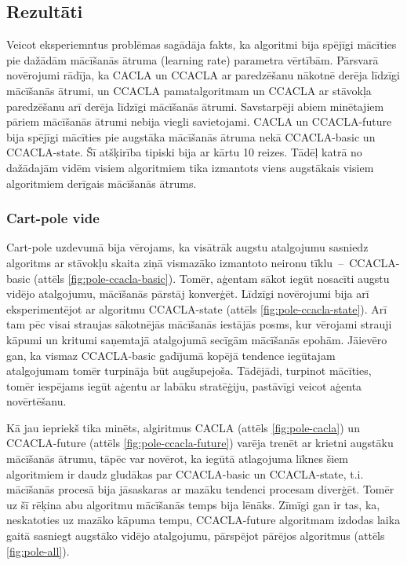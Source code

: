 \documentclass{ludis} %
\begin{document}
\subsection{Rezultāti}
Veicot eksperiemntus problēmas sagādāja fakts, ka algoritmi bija spējīgi
mācīties pie dažādām mācīšanās ātruma (learning rate) parametra vērtībām.
Pārsvarā novērojumi rādīja, ka CACLA un CCACLA ar paredzēšanu nākotnē derēja
līdzīgi mācīšanās ātrumi, un CCACLA pamatalgoritmam un CCACLA ar stāvokļa
paredzēšanu arī derēja līdzīgi mācīšanās ātrumi. Savstarpēji abiem minētajiem
pāriem mācīšanās ātrumi nebija viegli savietojami. CACLA un CCACLA-future bija
spējīgi mācīties pie augstāka mācīšanās ātruma nekā CCACLA-basic un
CCACLA-state. Šī atšķirība tipiski bija ar kārtu 10 reizes. Tādēļ katrā no
dažādajām vidēm visiem algoritmiem tika izmantots viens augstākais visiem
algoritmiem derīgais mācīšanās ātrums.

\subsubsection{Cart-pole vide}
Cart-pole uzdevumā bija vērojams, ka visātrāk augstu atalgojumu sasniedz
algoritms ar stāvokļu skaita ziņā vismazāko izmantoto neironu
tīklu~--~CCACLA-basic (attēls \ref{fig:pole-ccacla-basic}). Tomēr, aģentam sākot
iegūt nosacīti augstu vidējo atalgojumu, mācīšanās pārstāj konverģēt. Līdzīgi
novērojumi bija arī eksperimentējot ar algoritmu CCACLA-state (attēls
\ref{fig:pole-ccacla-state}). Arī tam pēc visai straujas sākotnējās mācīšanās
iestājās posms, kur vērojami strauji kāpumi un kritumi saņemtajā atalgojumā
secīgām mācīšanās epohām. Jāievēro gan, ka vismaz CCACLA-basic gadījumā kopējā
tendence iegūtajam atalgojumam tomēr turpināja būt augšupejoša. Tādējādi,
turpinot mācīties, tomēr iespējams iegūt aģentu ar labāku stratēģiju, pastāvīgi
veicot aģenta novērtēšanu.

Kā jau iepriekš tika minēts, algiritmus CACLA (attēls \ref{fig:pole-cacla}) un
CCACLA-future (attēls \ref{fig:pole-ccacla-future}) varēja trenēt ar krietni
augstāku mācīšanās ātrumu, tāpēc var novērot, ka iegūtā atlagojuma līknes šiem
algoritmiem ir daudz gludākas par CCACLA-basic un CCACLA-state, t.i. mācīšanās
procesā bija jāsaskaras ar mazāku tendenci procesam diverģēt. Tomēr uz šī rēķina
abu algoritmu mācīšanās temps bija lēnāks. Zīmīgi gan ir tas, ka, neskatoties uz
mazāko kāpuma tempu, CCACLA-future algoritmam izdodas laika gaitā sasniegt
augstāko vidējo atalgojumu, pārspējot pārējos algoritmus (attēls
\ref{fig:pole-all}).
\end{document}
